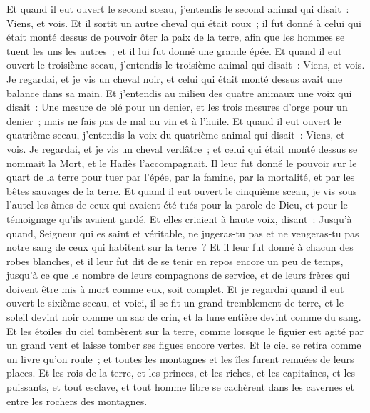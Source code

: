 \begin{multicols}{2}
Et quand il eut ouvert le second sceau, j'entendis le second animal qui disait~: Viens, et vois.
Et il sortit un autre cheval qui était roux~; il fut donné à celui qui était monté dessus de pouvoir ôter la paix de la terre, afin que les hommes se tuent les uns les autres~; et il lui fut donné une grande épée.
Et quand il eut ouvert le troisième sceau, j'entendis le troisième animal qui disait~: Viens, et vois. Je regardai, et je vis un cheval noir, et celui qui était monté dessus avait une balance dans sa main.
Et j'entendis au milieu des quatre animaux une voix qui disait~: Une mesure de blé pour un denier, et les trois mesures d'orge pour un denier~; mais ne fais pas de mal au vin et à l'huile.
Et quand il eut ouvert le quatrième sceau, j'entendis la voix du quatrième animal qui disait~: Viens, et vois.
Je regardai, et je vis un cheval verdâtre~; et celui qui était monté dessus se nommait la Mort, et le Hadès l'accompagnait. Il leur fut donné le pouvoir sur le quart de la terre pour tuer par l'épée, par la famine, par la mortalité, et par les bêtes sauvages de la terre.
Et quand il eut ouvert le cinquième sceau, je vis sous l'autel les âmes de ceux qui avaient été tués pour la parole de Dieu, et pour le témoignage qu'ils avaient gardé.
Et elles criaient à haute voix, disant~: Jusqu'à quand, Seigneur qui es saint et véritable, ne jugeras-tu pas et ne vengeras-tu pas notre sang de ceux qui habitent sur la terre~?
Et il leur fut donné à chacun des robes blanches, et il leur fut dit de se tenir en repos encore un peu de temps, jusqu'à ce que le nombre de leurs compagnons de service, et de leurs frères qui doivent être mis à mort comme eux, soit complet.
Et je regardai quand il eut ouvert le sixième sceau, et voici, il se fit un grand tremblement de terre, et le soleil devint noir comme un sac de crin, et la lune entière devint comme du sang.
Et les étoiles du ciel tombèrent sur la terre, comme lorsque le figuier est agité par un grand vent et laisse tomber ses figues encore vertes.
Et le ciel se retira comme un livre qu'on roule~; et toutes les montagnes et les îles furent remuées de leurs places.
Et les rois de la terre, et les princes, et les riches, et les capitaines, et les puissants, et tout esclave, et tout homme libre se cachèrent dans les cavernes et entre les rochers des montagnes.

\end{multicols}
